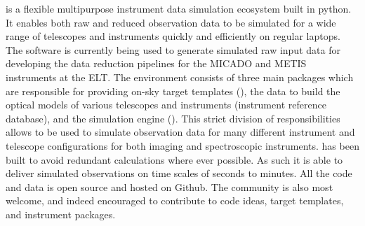 
\ScopeSim{} is a flexible multipurpose instrument data simulation ecosystem built in python.
It enables both raw and reduced observation data to be simulated for a wide range of telescopes and instruments quickly and efficiently on regular laptops.
The software is currently being used to generate simulated raw input data for developing the data reduction pipelines for the MICADO and METIS instruments at the ELT.
The \ScopeSim{} environment consists of three main packages which are responsible for providing on-sky target templates (\ScopeSimtemplates{}), the data to build the optical models of various telescopes and instruments (instrument reference database), and the simulation engine (\ScopeSim{}).
This strict division of responsibilities allows \ScopeSim{} to be used to simulate observation data for many different instrument and telescope configurations for both imaging and spectroscopic instruments.
\ScopeSim{} has been built to avoid redundant calculations where ever possible.
As such it is able to deliver simulated observations on time scales of seconds to minutes.
All the code and data is open source and hosted on Github.
The community is also most welcome, and indeed encouraged to contribute to code ideas, target templates, and instrument packages.
